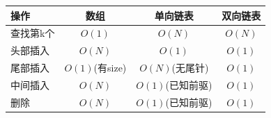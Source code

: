 \documentclass[10pt,a4paper]{article}
\begin{document}
\begin{center}
\begin{tabular}{|l|c|c|c|}
\hline
\textbf{操作} & \textbf{数组} & \textbf{单向链表} & \textbf{双向链表} \\
\hline
查找第k个 & $O(1)$ & $O(N)$ & $O(N)$ \\
头部插入 & $O(N)$ & $O(1)$ & $O(1)$ \\
尾部插入 & $O(1)$(有size) & $O(N)$(无尾针) & $O(1)$ \\
中间插入 & $O(N)$ & $O(1)$(已知前驱) & $O(1)$ \\
删除 & $O(N)$ & $O(1)$(已知前驱) & $O(1)$ \\
\hline
\end{tabular}
\end{center}
\end{document}
